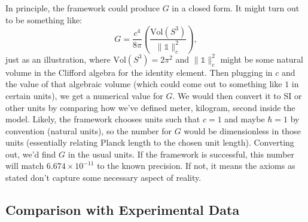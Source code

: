 \documentclass[11pt]{article}
\begin{document}
In principle, the framework could produce $G$ in a closed form. It might turn out to be something like:
\[ G = \frac{c^4}{8\pi} \left(\frac{\text{Vol}(S^3)}{\|\mathbb{1}\|_c^2}\right), \]
just as an illustration, where $\text{Vol}(S^3)=2\pi^2$ and $\|\mathbb{1}\|_c^2$ might be some natural volume in the Clifford algebra for the identity element. Then plugging in $c$ and the value of that algebraic volume (which could come out to something like $1$ in certain units), we get a numerical value for $G$. We would then convert it to SI or other units by comparing how we've defined meter, kilogram, second inside the model. Likely, the framework chooses units such that $c=1$ and maybe $\hbar=1$ by convention (natural units), so the number for $G$ would be dimensionless in those units (essentially relating Planck length to the chosen unit length). Converting out, we'd find $G$ in the usual units. If the framework is successful, this number will match $6.674\times 10^{-11}$ to the known precision. If not, it means the axioms as stated don't capture some necessary aspect of reality.

\subsection*{Comparison with Experimental Data}
\end{document}
